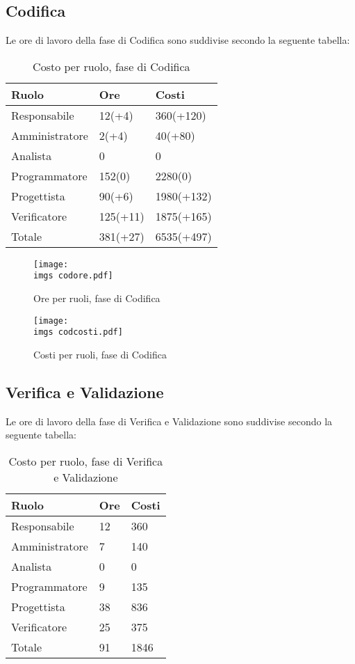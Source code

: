 {\subsection{Codifica}{
	Le ore di lavoro della fase di Codifica sono suddivise secondo la seguente tabella:
	\begin{table}[H]
		 \centering
		\begin{tabular}{p{}p{}
			  		  				p{}}
			  \toprule Ruolo & Ore  & Costi \\
			  \midrule
			  Responsabile & 12(+4)  & 360(+120) \\
			  Amministratore & 2(+4)   & 40(+80) \\
			  Analista & 0   & 0 \\
			  Programmatore & 152(0)  & 2280(0) \\
			  Progettista & 90(+6)  & 1980(+132) \\
			  Verificatore & 125(+11)  & 1875(+165) \\
			  \hline
			  Totale & 381(+27)  & 6535(+497) \\
			  \bottomrule
		  \end{tabular}
		 \label{tab:costocodifica}
		 \caption{Costo per ruolo, fase di Codifica}
	\end{table}
	
	\begin{figure}[H]
		\centering
		\texttt{[image: \\imgs codore.pdf]}
		\label{fig:orecodifica}
		\caption{Ore per ruoli, fase di Codifica}
	\end{figure}
	\begin{figure}[H]
		\centering
		\texttt{[image: \\imgs codcosti.pdf]}
		\label{fig:costocodifica}
		\caption{Costi per ruoli, fase di Codifica}
	\end{figure}
}
\subsection{Verifica e Validazione}{
	Le ore di lavoro della fase di Verifica e Validazione sono suddivise secondo la seguente tabella:
	\begin{table}[H]
		 \centering
		 \begin{tabular}{p{}p{}
		 	  		  				p{}}
			  \toprule Ruolo & Ore  & Costi \\
			  \midrule
			  Responsabile & 12  & 360 \\
			  Amministratore & 7   & 140 \\
			  Analista &  0  & 0 \\
			  Programmatore & 9   & 135 \\
			  Progettista & 38  & 836 \\
			  Verificatore & 25  & 375 \\
			  \hline
			  Totale & 91  & 1846 \\
			  \bottomrule
		 \end{tabular}
		 \label{tab:costoverifica}
		 \caption{Costo per ruolo, fase di Verifica e Validazione}
	\end{table}
	
}}
